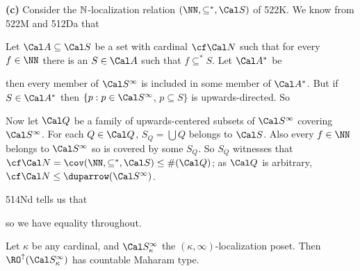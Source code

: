 {\medskip

{\bf (c)} Consider the $\Bbb N$-localization relation $(\NN,\subseteq^*,\Cal S)$
of 522K.   We know from 522M and 512Da that


\medskip

 Let $\Cal A\subseteq\Cal S$ be a set with cardinal
$\cf\Cal N$ such that for every $f\in\NN$ there is an $S\in\Cal A$ such
that $f\subseteq^*S$.   Let $\Cal A^*$ be


\noindent then every member of
$\Cal S^{\infty}$ is included in some member of $\Cal A^*$.   But if
$S\in\Cal A^*$ then $\{p:p\in\Cal S^{\infty}$, $p\subseteq S\}$ is
upwards-directed.   So


\medskip

 Now let $\Cal Q$ be a family of upwards-centered subsets
of $\Cal S^{\infty}$ covering $\Cal S^{\infty}$.   For each
$Q\in\Cal Q$, $S_Q=\bigcup Q$ belongs to $\Cal S$.   Also every
$f\in\NN$ belongs to $\Cal S^{\infty}$ so is covered by some $S_Q$.   So
$S_Q$ witnesses that
$\cf\Cal N=\cov(\NN,\subseteq^*,\Cal S)\le\#(\Cal Q)$;  as $\Cal Q$ is
arbitrary, $\cf\Cal N\le\duparrow(\Cal S^{\infty})$.

\medskip

 514Nd tells us that


\noindent so we have equality throughout.
}%

 Let $\kappa$ be any cardinal, and
$\Cal S^{\infty}_{\kappa}$ the $(\kappa,\infty)$-localization poset.
Then $\RO^{\uparrow}(\Cal S^{\infty}_{\kappa})$ has countable Maharam
type.

